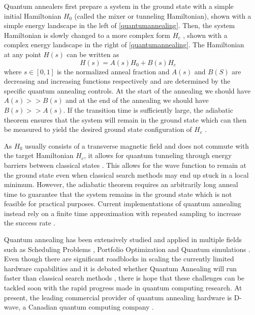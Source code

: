 Quantum annealers first prepare a system in the ground state with a simple initial Hamiltonian $H_0$ (called the mixer or tunneling Hamiltonian), shown with a simple energy landscape in the left of \autoref{quantumannealing}. Then, the system Hamiltonian is slowly changed to a more complex form $H_c$ \cite{b10}, shown with a complex energy landscape in the right of \autoref{quantumannealing}. The Hamiltonian at any point $H(s)$ can be written as
\begin{equation}
    \label{eqn:annealinghamiltonian}
    H(s) = A(s)H_0 + B(s)H_c
\end{equation}
where $s \in [0,1]$ is the normalized anneal fraction and $A(s)$ and $B(S)$ are decreasing and increasing functions respectively and are determined by the specific quantum annealing controls. At the start of the annealing we should have $A(s) >> B(s)$ and at the end of the annealing we should have $B(s) >> A(s)$. If the transition time is sufficiently large, the adiabatic theorem ensures that the system will remain in the ground state which can then be measured to yield the desired ground state configuration of $H_c$ \cite{b14}. 

As $H_0$ usually consists of a transverse magnetic field and does not commute with the target Hamiltonian $H_c$, it allows for quantum tunneling through energy barriers between classical states \cite{kadowaki1998quantum}. This allows for the wave function to remain at the ground state even when classical search methods may end up stuck in a local minimum. However, the adiabatic theorem requires an arbitrarily long anneal time to guarantee that the system remains in the ground state which is not feasible for practical purposes. Current implementations of quantum annealing instead rely on a finite time approximation with repeated sampling to increase the success rate \cite{farhi2001}.

Quantum annealing has been extensively studied and applied in multiple fields such as Scheduling Problems \cite{b17}, Portfolio Optimization \cite{b18} and Quantum simulations \cite{b19}. Even though there are significant roadblocks in scaling the currently limited hardware capabilities \cite{b14} and it is debated whether Quantum Annealing will run faster than classical search methods \cite{b10}, there is hope that these challenges can be tackled soon with the rapid progress made in quantum computing research. At present, the leading commercial provider of quantum annealing hardware is D-wave, a Canadian quantum computing company \cite{b16}.

